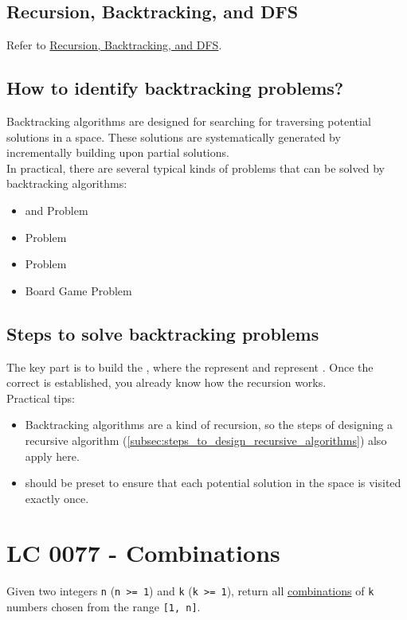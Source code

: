 \subsection{Recursion, Backtracking, and DFS}
Refer to \hyperref[subsec:recursion_backtracking_dfs]{Recursion, Backtracking, and DFS}.

\subsection{How to identify backtracking problems?}
Backtracking algorithms are designed for searching for traversing potential solutions in a space. These solutions are systematically generated by incrementally building upon partial solutions. \\

In practical, there are several typical kinds of problems that can be solved by backtracking algorithms:
\begin{itemize}
	\item {\color{blue}{Combination}} and {\color{blue}{Permutation}} Problem
	\item {\color{blue}{Subset}} Problem
	\item {\color{blue}{Rod Cutting}} Problem
	\item Board Game Problem
\end{itemize}

\subsection{Steps to solve backtracking problems}
The key part is to build the {\color{blue}{potential search tree}}, where the {\color{blue}{nodes}} represent {\color{blue}{partial solutions}} and {\color{blue}{edges}} represent {\color{blue}{extension steps}}. Once the correct {\color{blue}{potential search tree}} is established, you already know how the recursion works.\\

Practical tips:
\begin{itemize}
	\item Backtracking algorithms are a kind of recursion, so the steps of designing a recursive algorithm (\ref{subsec:steps_to_design_recursive_algorithms}) also apply here.
	\item {\color{blue}{Searching order}} should be preset to ensure that each potential solution in the space is visited exactly once.
\end{itemize}

\section{LC 0077 - Combinations}
Given two integers {\colorbox{CodeBackground}{\lstinline|n|}} ({\colorbox{CodeBackground}{\lstinline|n >= 1|}}) and {\colorbox{CodeBackground}{\lstinline|k|}} ({\colorbox{CodeBackground}{\lstinline|k >= 1|}}), return all \ul{combinations} of {\colorbox{CodeBackground}{\lstinline|k|}} numbers chosen from the range {\colorbox{CodeBackground}{\lstinline|[1, n]|}}.\\

